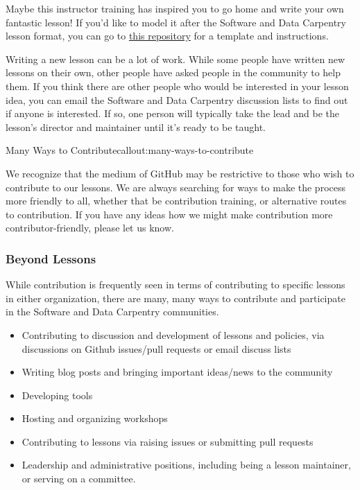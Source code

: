 Maybe this instructor training has inspired you to go home and write
your own fantastic lesson! If you'd like to model it after the Software
and Data Carpentry lesson format, you can go to
\href{fixme}{this repository} for a template
and instructions.

Writing a new lesson can be a lot of work. While some people have
written new lessons on their own, other people have asked people in the
community to help them. If you think there are other people who would be
interested in your lesson idea, you can email the Software and Data
Carpentry discussion lists to find out if anyone is interested. If so,
one person will typically take the lead and be the lesson's director and
maintainer until it's ready to be taught.

\begin{callout}{Many Ways to Contribute}{callout:many-ways-to-contribute}

We recognize that the medium of GitHub may be restrictive to those who
wish to contribute to our lessons. We are always searching for ways to
make the process more friendly to all, whether that be contribution
training, or alternative routes to contribution. If you have any ideas
how we might make contribution more contributor-friendly, please let us
know.
\end{callout}

\subsubsection{Beyond Lessons}\label{beyond-lessons}

While contribution is frequently seen in terms of contributing to
specific lessons in either organization, there are many, many ways to
contribute and participate in the Software and Data Carpentry
communities.

\begin{itemize}
\item
  Contributing to discussion and development of lessons and policies,
  via discussions on Github issues/pull requests or email discuss lists
\item
  Writing blog posts and bringing important ideas/news to the community
\item
  Developing tools
\item
  Hosting and organizing workshops
\item
  Contributing to lessons via raising issues or submitting pull requests
\item
  Leadership and administrative positions, including being a lesson
  maintainer, or serving on a committee.
\end{itemize}

